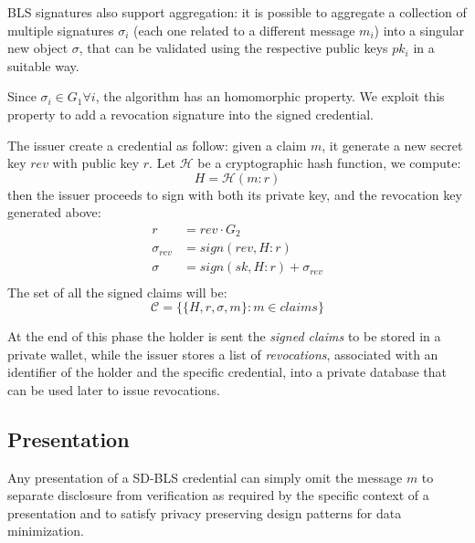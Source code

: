 BLS signatures also support aggregation: it is possible to aggregate a
collection of multiple signatures $\sigma_i$ (each one related to a
different message $m_i$) into a singular new object $\sigma$, that can
be validated using the respective public keys $pk_i$ in a suitable
way.

Since $\sigma_i\in G_1 \forall i$, the algorithm has an homomorphic
property. We exploit this property to add a revocation signature into
the signed credential.

The issuer create a credential as follow: given a claim $m$, it
generate a new secret key $rev$ with public key $r$. Let $\mathcal{H}$
be a cryptographic hash function, we compute:
\begin{equation*}
    H = \mathcal{H}(m : r)
\end{equation*}
then the issuer proceeds to sign with both its private key, and the
revocation key generated above:
\begin{equation*}\label{rev_agg}
    \begin{split}
        r &= rev \cdot G_2 \\
        \sigma_{rev} &= sign(rev, H : r)\\
        \sigma &= sign(sk, H : r) + \sigma_{rev}\\
   \end{split}
\end{equation*}
The set of all the signed claims will be:
\begin{equation*}
   \mathcal{C} = \big\{ \{H, r, \sigma, m \} : m\in claims  \big\}
\end{equation*}

At the end of this phase the holder is sent the \textit{signed claims}
to be stored in a private wallet, while the issuer stores a list of
\textit{revocations}, associated with an identifier of the holder and
the specific credential, into a private database that can be used
later to issue revocations.



\subsection{Presentation} \label{presentation}

Any presentation of a SD-BLS credential can simply omit the message
$m$ to separate disclosure from verification as required by the
specific context of a presentation and to satisfy privacy preserving
design patterns for data minimization.


